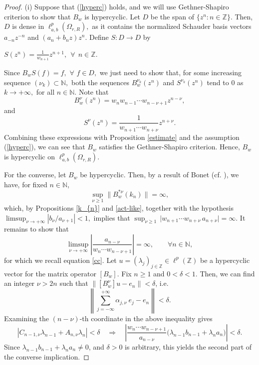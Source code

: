 \documentclass[12pt, reqno]{amsart}
\theoremstyle{definition}
\theoremstyle{remark}
\numberwithin{equation}{section}
\begin{document}
    \begin{proof}
           (i) Suppose that (\ref{hyperc}) holds, and we will use Gethner-Shapiro criterion to show that $B_{w}$ is hypercyclic. Let $D$ be the span of $\{z^{n}:n\in \mathbb{Z}\}$. Then, $D$ is dense in $\ell^{p}_{a,b}(\Omega_{r,R}),$ as it contains the normalized Schauder basis vectors $a_{-n}z^{-n}$ and $(a_{n}+b_{n}z)z^{n}$. Define $S:D\rightarrow D$ by 
           \begin{center}
           $S(z^{n})=\frac{1}{w_{n+1}}z^{n+1},~~ \forall~~ n\in \mathbb{Z}.$
           \end{center}
           Since $B_{w}S(f)=f,$ $\forall$ $f\in D,$ we just need to show that, for some increasing sequence $(\nu_{k})\subset \mathbb{N},$ both the sequences $B_{w}^{\nu_{k}}(z^{n})$ and $S^{\nu_{k}}(z^{n})$ tend to 0 as $k\to +\infty,$ for all $n\in \mathbb{N}.$ Note that
       \[
       B^{\nu}_{w}(z^{n}) =w_{n}w_{n-1}\cdots w_{n-\nu+1}z^{n-\nu}, 
       \]
       and 
       \[
       S^{\nu}(z^{n}) =\frac{1}{w_{n+1}\cdots w_{n+\nu}}z^{n+\nu}.
       \]
       Combining these expressions with Proposition \ref{estimate} and the assumption (\ref{hyperc}), we can see that $B_{w}$ satisfies the Gethner-Shapiro criterion. Hence, $B_{w}$ is hypercyclic on $\ell^{p}_{a,b}(\Omega_{r,R}).$
       
      For the converse, let $B_w$ be hypercyclic. Then, by a result of Bonet (cf. \cite{Bonet1}), we have, for fixed $n\in \mathbb{N}$,
\[
\sup_{\nu\geq 1}\|B_w^{*\nu}(k_n)\|=\infty,
\]
which, by Propositions \ref{k_{n}} and \ref{act-like}, together with the hypothesis  
\(\displaystyle \limsup_{\nu\to +\infty}|b_\nu/a_{\nu+1}|<1,\)  
implies that  
$
\sup_{\nu\geq 1}\,\bigl|w_{n+1}\cdots w_{n+\nu}\,a_{n+\nu}\bigr|=\infty.
$
It remains to show that  
\[
\limsup_{\nu\to +\infty}\left|\frac{a_{n-\nu}}{w_n\cdots w_{n-\nu+1}}\right|=\infty,
\qquad \forall n\in\mathbb{N},
\]
for which we recall equation \eqref{cc}. Let $u=(\lambda_j)_{j\in\mathbb{Z}}\in\ell^p(\mathbb{Z})$ be a hypercyclic vector for the matrix operator $[B_w]$. Fix $n\geq 1$ and $0<\delta<1$. Then, we can find an integer $\nu>2 n$ such that  $\|[B_w^\nu]u - e_n\| < \delta$, i.e.
\[
\left\lVert \sum_{j=-\infty}^{+\infty} \alpha_{j,\nu} ~ e_{j}- e_n\right\rVert < \delta.
\]
Examining the $(n-\nu)$-th coordinate in the above inequality gives
\[
|C_{n-1,\nu}\lambda_{n-1} + A_{n,\nu}\lambda_n| < \delta
\quad\Rightarrow\quad
\left|\frac{w_n\cdots w_{n-\nu+1}}{a_{n-\nu}}\bigl(\lambda_{n-1}b_{n-1}+\lambda_n a_n\bigr)\right| < \delta.
\]
Since $\lambda_{n-1}b_{n-1}+\lambda_n a_n\neq 0$, and $\delta>0$ is arbitrary, this yields the second part of the converse implication.\vspace{3mm}


\end{proof}
\end{document}
